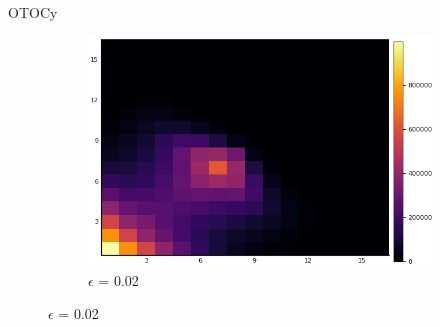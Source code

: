 \documentclass{article}
\begin{document}
\begin{section}{OTOCy}
\begin{figure}[H]
\begin{subfigure}{.33\textwidth}
        
                                    \end{subfigure}%
                                    \begin{subfigure}{.33\textwidth}
                                      \centering
                                      \includegraphics[width=1.0\linewidth]{nW0.02.png}
                                      \caption{$\epsilon$ = 0.02}
                                    \end{subfigure}%
        

\end{figure}
\end{section}
\end{document}
